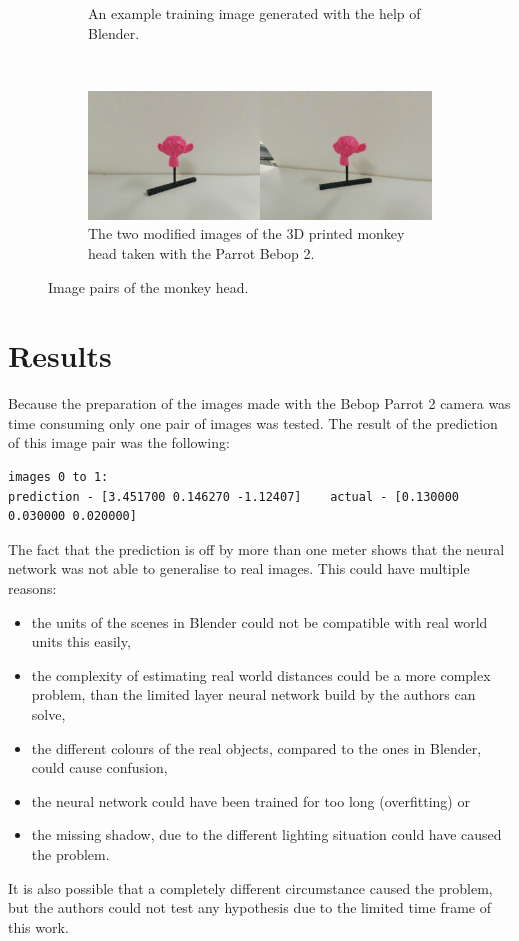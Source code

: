 \begin{figure}[h!]
\begin{subfigure}[t]{\textwidth}
		\caption{An example training image generated with the help of Blender.}
	\end{subfigure}
	~ 
	\begin{subfigure}[t]{\textwidth}
		\centering
		\includegraphics[width=\textwidth]{img/experiment2_environment_comparison_1.jpg}
		\caption{The two modified images of the 3D printed monkey head taken with the Parrot Bebop 2.}
	\end{subfigure}
	\caption{Image pairs of the monkey head.}
	\label{pic:experiment2_environment_comparison}
\end{figure}

\section{Results}
Because the preparation of the images made with the Bebop Parrot 2 camera was time consuming only one pair of images was tested. The result of the prediction of this image pair was the following:

\begin{lstlisting}[]
images 0 to 1:
prediction - [3.451700 0.146270 -1.12407]    actual - [0.130000 0.030000 0.020000]
\end{lstlisting}

The fact that the prediction is off by more than one meter shows that the neural network was not able to generalise to real images. This could have multiple reasons:

\begin{itemize}
	\item the units of the scenes in Blender could not be compatible with real world units this easily,
	\item the complexity of estimating real world distances could be a more complex problem, than the limited layer neural network build by the authors can solve,
	\item the different colours of the real objects, compared to the ones in Blender, could cause confusion,
	\item the neural network could have been trained for too long (overfitting) or
	\item the missing shadow, due to the different lighting situation could have caused the problem.
\end{itemize}

It is also possible that a completely different circumstance caused the problem, but the authors could not test any hypothesis due to the limited time frame of this work.

\filbreak